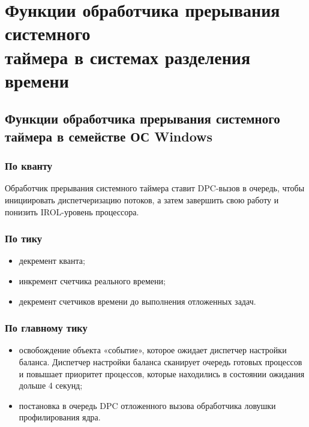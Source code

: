 \chapter{Функции обработчика прерывания системного \\ таймера в системах разделения времени}

\section{Функции обработчика прерывания системного \\ таймера в семействе ОС Windows}

\subsection*{По кванту}

Обработчик прерывания системного таймера ставит DPC-вызов в очередь, чтобы инициировать диспетчеризацию потоков, а затем завершить свою работу и понизить IROL-уровень процессора.

\subsection*{По тику}

\begin{itemize}[label*=--]
	\item декремент кванта;
	\item  инкремент счетчика реального времени;
	\item декремент счетчиков времени до выполнения отложенных задач.
\end{itemize}

\subsection*{По главному тику}

\begin{itemize}[label*=--]
	\item освобождение объекта «событие», которое ожидает диспетчер настройки баланса. Диспетчер настройки баланса сканирует очередь готовых процессов и повышает приоритет процессов, которые находились в состоянии ожидания дольше 4 секунд;
	\item постановка в очередь DPC отложенного вызова обработчика ловушки профилирования ядра.
\end{itemize}

\clearpage


